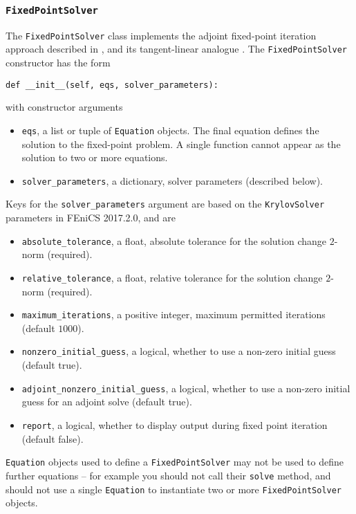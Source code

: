 \documentclass[11pt]{article}
\begin{document}
\subsubsection{\texttt{FixedPointSolver}}

The \texttt{FixedPointSolver} class implements the adjoint fixed-point
iteration approach described in \citet{christianson1994}, and its
tangent-linear analogue \citep{gilbert1992}. The \texttt{FixedPointSolver}
constructor has the form
\begin{lstlisting}
def __init__(self, eqs, solver_parameters):
\end{lstlisting}
with constructor arguments
\begin{itemize}
  \item \texttt{eqs}, a list or tuple of \texttt{Equation} objects. The final
    equation defines the solution to the fixed-point problem. A single function
    cannot appear as the solution to two or more equations.
  \item \texttt{solver\_parameters}, a dictionary, solver parameters (described
    below).
\end{itemize}
Keys for the \texttt{solver\_parameters} argument are based on the
\texttt{KrylovSolver} parameters in FEniCS 2017.2.0, and are
\begin{itemize}
  \item \texttt{absolute\_tolerance}, a float, absolute tolerance for the
    solution change $2$-norm (required).
  \item \texttt{relative\_tolerance}, a float, relative tolerance for the
    solution change $2$-norm (required).
  \item \texttt{maximum\_iterations}, a positive integer, maximum permitted
    iterations (default $1000$).
  \item \texttt{nonzero\_initial\_guess}, a logical, whether to use a non-zero
    initial guess (default true).
  \item \texttt{adjoint\_nonzero\_initial\_guess}, a logical, whether to use a
    non-zero initial guess for an adjoint solve (default true).
  \item \texttt{report}, a logical, whether to display output during fixed
    point iteration (default false).
\end{itemize}

\texttt{Equation} objects used to define a \texttt{FixedPointSolver} may not be
used to define further equations -- for example you should not call their
\texttt{solve} method, and should not use a single \texttt{Equation} to
instantiate two or more \texttt{FixedPointSolver} objects.
\end{document}
